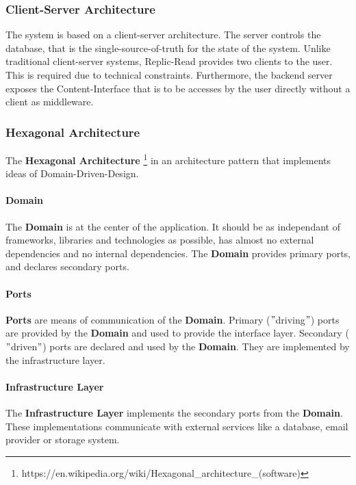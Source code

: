 \subsubsection{Client-Server Architecture}
The system is based on a client-server architecture.
The server controls the database, that is the single-source-of-truth for the state of the system. \newline
Unlike traditional client-server systems, Replic-Read provides two clients to the user.
This is required due to technical constraints. \newline
Furthermore, the backend server exposes the Content-Interface that is to be accesses by the user directly without a client as middleware.

\subsubsection{Hexagonal Architecture}
The \textbf{Hexagonal Architecture} \footnote{https://en.wikipedia.org/wiki/Hexagonal\_architecture\_(software)} in an architecture pattern that implements ideas of Domain-Driven-Design.

\paragraph{Domain}
The \textbf{Domain} is at the center of the application.
It should be as independant of frameworks, libraries and technologies as possible, has almost no external dependencies and no internal dependencies.
The \textbf{Domain} provides primary ports, and declares secondary ports.

\paragraph{Ports}
\textbf{Ports} are means of communication of the \textbf{Domain}.
Primary (\("\)driving\("\)) ports are provided by the \textbf{Domain} and used to provide the interface layer.
Secondary (\("\)driven\("\)) ports are declared and used by the \textbf{Domain}.
They are implemented by the infrastructure layer.

\paragraph{Infrastructure Layer}
The \textbf{Infrastructure Layer} implements the secondary ports from the \textbf{Domain}.
These implementations communicate with external services like a database, email provider or storage system.

